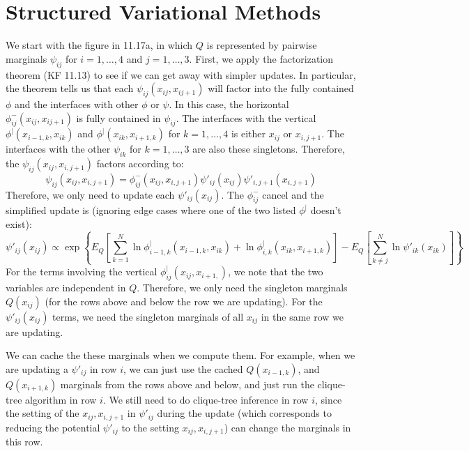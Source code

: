 \documentclass[11pt]{article}
\begin{document}
\section{Structured Variational Methods}
We start with the figure in 11.17a, in which $Q$ is represented by pairwise marginals $\psi_{ij}$ for $i=1,\ldots,4$ and $j=1,\ldots,3$. First, we apply the factorization theorem (KF 11.13) to see if we can get away with simpler updates. In particular, the theorem tells us that each $\psi_{ij}(x_{ij},x_{ij+1})$ will factor into the fully contained $\phi$ and the interfaces with other $\phi$ or $\psi$. In this case, the horizontal $\phi^{-}_{ij}(x_{ij},x_{ij+1})$ is fully contained in $\psi_{ij}$. The interfaces with the vertical $\phi^{|}(x_{i-1,k},x_{ik})$ and $\phi^{|}(x_{ik},x_{i+1,k})$ for $k=1,\ldots,4$ is either $x_{ij}$ or $x_{i,j+1}$. The interfaces with the other $\psi_{ik}$ for $k=1,\ldots,3$ are also these singletons. Therefore, the $\psi_{ij}(x_{ij},x_{i,j+1})$ factors according to:
\[ \psi_{ij}(x_{ij},x_{i,j+1}) = \phi^{-}_{ij}(x_{ij},x_{i,j+1}) \psi'_{ij}(x_{ij}) \psi'_{i,j+1}(x_{i,j+1})\]
Therefore, we only need to update each $\psi'_{ij}(x_{ij})$. The $\phi^{-}_{ij}$ cancel and the simplified update is (ignoring edge cases where one of the two listed $\phi^{|}$ doesn't exist):
\[ \psi'_{ij}(x_{ij}) \propto \exp \left\{ E_Q\left[ \sum_{k=1}^N \ln \phi^{|}_{i-1,k}(x_{i-1,k},x_{ik}) + \ln \phi^{|}_{i,k}(x_{ik},x_{i+1,k}) \right] - E_Q\left[\sum_{k \ne j}^N \ln \psi'_{ik}(x_{ik}) \right] \right\} \]
For the terms involving the vertical $\phi^{|}_{ij}(x_{ij},x_{i+1,})$, we note that the two variables are independent in $Q$. Therefore, we only need the singleton marginals $Q(x_{ij})$ (for the rows above and below the row we are updating). For the $\psi'_{ij}(x_{ij})$ terms, we need the singleton marginals of all $x_{ij}$ in the same row we are updating.

We can cache the these marginals when we compute them. For example, when we are updating a $\psi'_{ij}$ in row $i$, we can just use the cached $Q(x_{i-1,k})$, and $Q(x_{i+1,k})$ marginals from the rows above and below, and just run the clique-tree algorithm in row $i$. We still need to do clique-tree inference in row $i$,  since the setting of the $x_{ij},x_{i,j+1}$ in $\psi'_{ij}$ during the update (which corresponds to reducing the potential $\psi'_{ij}$ to the setting $x_{ij},x_{i,j+1}$) can change the marginals in this row.
\end{document}
